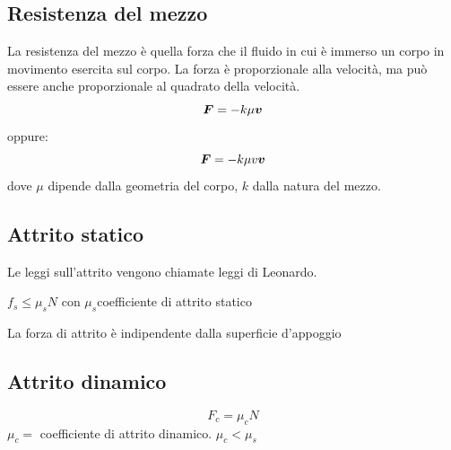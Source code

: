 \subsection{Resistenza del mezzo}
La resistenza del mezzo è quella forza che il fluido in cui è
immerso un corpo in movimento esercita sul corpo. La forza è
proporzionale alla velocità, ma può essere anche proporzionale al
quadrato della velocità.
\begin{equation*}
\boldsymbol{F}=-k\mu \boldsymbol{v}
\end{equation*}
oppure:
\begin{equation*}
\boldsymbol{F}=-k\mu v\boldsymbol{v}
\end{equation*}
dove $\mu$ dipende dalla geometria del corpo,
$k$ dalla natura del mezzo.
\subsection{Attrito statico}
Le leggi sull'attrito vengono chiamate leggi di Leonardo.
\begin{legge}
$f_s\leq\mu_s N$ con $\mu_s$coefficiente di attrito statico
\end{legge}
\begin{legge}
La forza di attrito è indipendente dalla superficie d'appoggio
\end{legge}
\subsection{Attrito dinamico}
\begin{equation*}
F_c=\mu_cN
\end{equation*}
$\mu_c=$ coefficiente di attrito dinamico. $\mu_c<\mu_s$

